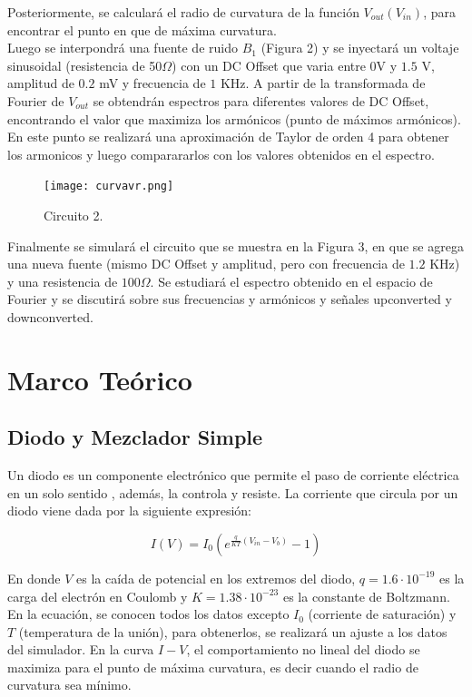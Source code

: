 \documentclass[letterpaper,oneside]{article}
\begin{document}
Posteriormente, se calculará el radio de curvatura de la función $V_{out}(V_{in})$, para encontrar el punto en que de máxima curvatura.\\

Luego se interpondrá una fuente de ruido $B_1$ (Figura 2) y se inyectará un voltaje sinusoidal (resistencia de 50$\Omega$) con un DC Offset que varia entre $0$V y $1.5$ V, amplitud de $0.2$ mV y frecuencia de $1$ KHz. A partir de la transformada de Fourier de $V_{out}$ se obtendrán espectros para diferentes valores de DC Offset, encontrando el valor que maximiza los armónicos (punto de máximos armónicos). En este punto se realizará una aproximación de Taylor de orden 4  para obtener los armonicos y luego comparararlos con los valores obtenidos en el espectro.\\

\begin{figure}
  \centering
  \texttt{[image: curvavr.png]}
  \caption{Circuito 2.}
\end{figure}

Finalmente se simulará el circuito que se muestra en la Figura 3, en que se agrega una nueva fuente (mismo DC Offset y amplitud, pero con frecuencia de $1.2$ KHz) y una resistencia de $100\Omega$. Se estudiará el espectro obtenido en el espacio de Fourier y se discutirá sobre sus frecuencias y armónicos y señales upconverted y downconverted.

\section{Marco Teórico}
\subsection{Diodo y Mezclador Simple}
Un diodo es un componente electrónico que permite el paso de corriente eléctrica en un solo sentido , además, la controla y resiste. La corriente que circula por un diodo viene dada por la siguiente expresión:

\begin{equation}
    I(V) = I_0(e^{\frac{q}{KT}(V_{in}-V_{b})}-1)
\end{equation}

En donde $V$ es la caída de potencial en los extremos del diodo, $q=1.6 \cdot 10^{-19}$ es la carga del electrón en Coulomb y $K= 1.38 \cdot 10^{-23}$ es la constante de Boltzmann. En la ecuación, se conocen todos los datos excepto $I_0$ (corriente de saturación) y $T$ (temperatura de la unión), para obtenerlos, se realizará un ajuste a los datos del simulador. En la curva $I-V$, el comportamiento no lineal del diodo se maximiza para el punto de máxima curvatura, es decir cuando el radio de curvatura sea mínimo.
\end{document}
